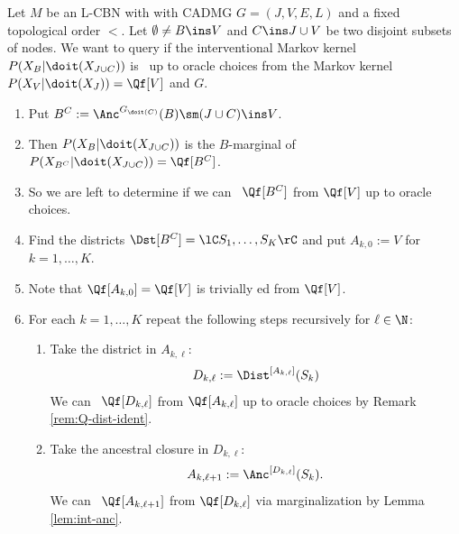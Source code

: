\begin{Alg}[ID-algorithm] \label{alg:id}
    Let $M$ be an L-CBN with with \observational CADMG $G=(J,V,E,L)$ and a fixed topological order $<$.
    Let $\emptyset \neq B \ins V$ and $C \ins J \cup V$ be two disjoint subsets of nodes. 
    We want to query if the interventional Markov kernel $P(X_B|\doit(X_{J \cup C}))$ is \trackable\ up to oracle choices
    from the \observational Markov kernel $P(X_V|\doit(X_J))=\Qf[V]$ and $G$.
    \begin{enumerate}
        \item Put $B^C:=\Anc^{G_{\doit(C)}}(B) \sm (J \cup C) \ins V$. 
        \item[] Then $P(X_B|\doit(X_{J \cup C}))$ is the 
            $B$-marginal of $P(X_{B^C}|\doit(X_{J \cup C})) = \Qf[B^C]$.
        \item[] So we are left to determine if we can \track\ $\Qf[B^C]$ from $\Qf[V]$ up to oracle choices.
        \item Find the districts $\Dst[B^C]=\lC S_1,\dots,S_K\rC$ and put $A_{k,0}:=V$ for $k=1,\dots,K$.
        \item[] Note that $\Qf[A_{k,0}]=\Qf[V]$ is trivially \track ed from $\Qf[V]$.
        \item For each $k=1,\dots, K$ repeat the following steps recursively for $\ell \in \N$:
            \begin{enumerate}
                \item Take the district in $A_{k,\ell}$:
                        \[ D_{k,\ell} := \Dist^{[A_{k,\ell}]}(S_k) \]
                        We can \track\ $\Qf[D_{k,\ell}]$ from $\Qf[A_{k,\ell}]$ up to oracle choices by Remark \ref{rem:Q-dist-ident}.
                \item Take the ancestral closure in $D_{k,\ell}$: 
                    \[ A_{k,\ell+1}:=\Anc^{[D_{k,\ell}]}(S_k). \] 
                    We can \track\ $\Qf[A_{k,\ell+1}]$ from $\Qf[D_{k,\ell}]$ via marginalization by Lemma \ref{lem:int-anc}.


\end{enumerate}
\end{enumerate}
\end{Alg}
